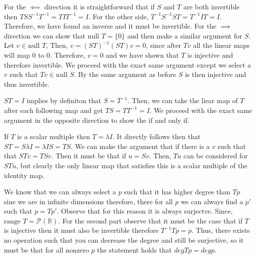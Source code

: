 \documentclass[10pt, twocolumn]{article}
\newcommand{\R}{\mathbb{R}}
\newcommand{\poly}[2]{\mathcal{P}_{#1}\left(#2\right)}
\newcommand{\inv}[1]{#1^{-1}}
\newcommand{\nul}{\text{null }}
\newcommand{\range}{\text{range }}
\begin{document}
\begin{q}[9]
    For the $ \impliedby $ direction it is straightforward that if $ S $ and $ T $ are both invertible then $ TS\inv{S}\inv{T} = TI\inv{T} = I$. 
    For the other side, $ \inv{T} \inv{S} S T = \inv{T} I T = I $. Therefore, we have found an inverse and it must be invertible.
    For the $ \implies $ direction we can show that $ \nul T = \{0\} $ and then make a similar argument for $ S $. 
    Let $ v \in \nul T $, 
    Then, $ v = \inv{(ST)} (ST)v = 0 $, since after $ Tv $ all the linear maps will map 0 to 0. Therefore,  $ v = 0 $ and we have shown that $ T $ is injective and therefore invertible.
    We proceed with the exact same argument except we select a $ v $ such that $ Tv \in \nul S $. 
    By the same argument as before $ S $ is then injective and thus invertible. 
\end{q}
\begin{q}[10]
    $ ST = I $ implies by definiton that $ S = \inv{T} $. Then, we can take the liear map of $ T $ after each following map and get $ TS = T \inv{T} = I $. 
    We proceed with the exact same argument in the opposite direction to show the if and only if.
\end{q}
\begin{q}[16]
    If $ T $ is a scalar multiple then $ T = \lambda I $. 
    It directly follows then that $ ST = S\lambda I = \lambda I S = TS $. 
    We can make the argument that if there is a $ v $ such that that $ STv = TSv $. Then it must be that if $ u = Sv $. Then, $Tu$ 
    can be considered for $ STu $, but clearly the only linear map that satisfies this is a scalar multiple of the identity map.
\end{q}
\begin{q}[19]
    We know that we can always select a $ p $ such that it has higher degree than $ Tp $ sine we are in infinite dimensions therefore, there for all $ p $ we can always find a $ p' $ such that $ p = Tp' $. 
    Observe that for this reason it is always surjectve. 
    Since, $ \range T = \poly{}{\R} $. 
    For the second part observe that it must be the case that if $ T $ is injective then it must also be invertible therefore $ \inv{T}T p = p $. 
    Thus, there exists no operation such that you can decrease the degree and still be surjective, so it must be that for all nonzero $ p $ 
    the statement holds that $ deg Tp = deg p $. 
\end{q}
\end{document}
